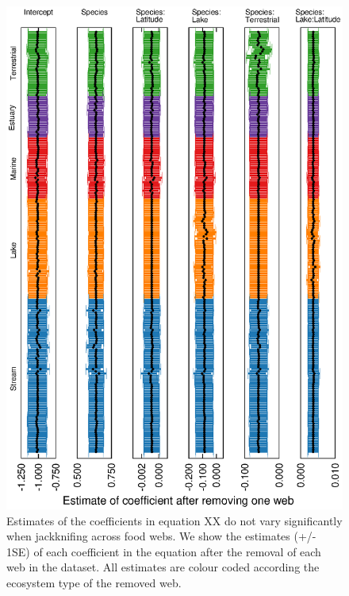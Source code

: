 \documentclass[12pt]{article}
\begin{document}
    \begin{figure}[h]
    \centerline{\includegraphics*[width=.8\textwidth]{Figures/Jackknife/Vul_web.eps}}
    \caption{Estimates of the coefficients in equation XX do not vary significantly
    when jackknifing across food webs. We show the estimates (+/- 1SE) of each coefficient
    in the equation after the removal of each web in the dataset. All estimates are colour
    coded according the ecosystem type of the removed web.}
    \label{Vul_web}
    \end{figure}
\end{document}
